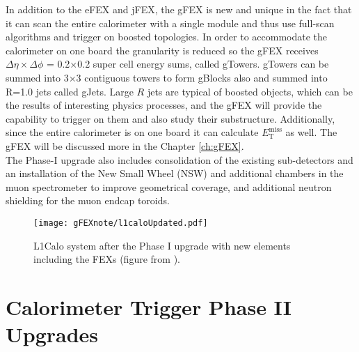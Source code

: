 In addition to the eFEX and jFEX, the gFEX is new and unique in the fact that it can scan the entire calorimeter with a single module and thus use full-scan algorithms and trigger on boosted topologies.  In order to accommodate the calorimeter on one board the granularity is reduced so the gFEX receives $\Delta\eta \times \Delta\phi$ = 0.2$\times$0.2 super cell energy sums, called gTowers.  gTowers can be summed into 3$\times$3 contiguous towers to form gBlocks also and summed into R=1.0 jets called gJets.  Large $R$ jets are typical of boosted objects, which can be the results of interesting physics processes, and the gFEX will provide the capability to trigger on them and also study their substructure.  Additionally, since the entire calorimeter is on one board it can calculate $E_{\mathrm{T}}^{\mathrm{miss}}$ as well.  The gFEX will be discussed more in the Chapter \ref{ch:gFEX}.  \\%

%

The Phase-I upgrade also includes consolidation of the existing sub-detectors and an installation of the New Small Wheel (NSW) and additional chambers in the muon spectrometer to improve geometrical coverage, and additional neutron shielding for the muon endcap toroids.  \\

\begin{figure} [h!]
\centering
\texttt{[image: gFEXnote/l1caloUpdated.pdf]} %
\caption[L1Calo system after the Phase I upgrade]{\label{fig:l1calo}{L1Calo system after the Phase I upgrade with new elements including the FEXs (figure from \cite{gFEXFDR}).  }}
\end{figure}

\section{Calorimeter Trigger Phase II Upgrades}
\label{sec:HLLHC}

